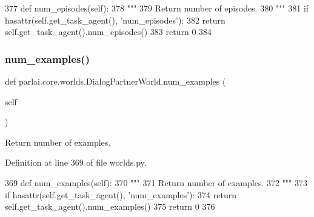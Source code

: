 \begin{DoxyCode}
377     \textcolor{keyword}{def }num\_episodes(self):
378         \textcolor{stringliteral}{"""}
379 \textcolor{stringliteral}{        Return number of episodes.}
380 \textcolor{stringliteral}{        """}
381         \textcolor{keywordflow}{if} hasattr(self.get\_task\_agent(), \textcolor{stringliteral}{'num\_episodes'}):
382             \textcolor{keywordflow}{return} self.get\_task\_agent().num\_episodes()
383         \textcolor{keywordflow}{return} 0
384 
\end{DoxyCode}
\mbox{\label{classparlai_1_1core_1_1worlds_1_1DialogPartnerWorld_aa925a37ec5968d137faf044279943e6a}} 
\subsubsection{\texorpdfstring{num\+\_\+examples()}{num\_examples()}}
{\footnotesize\ttfamily def parlai.\+core.\+worlds.\+Dialog\+Partner\+World.\+num\+\_\+examples (\begin{DoxyParamCaption}\item[{}]{self }\end{DoxyParamCaption})}

\begin{DoxyVerb}Return number of examples.
\end{DoxyVerb}
 

Definition at line 369 of file worlds.\+py.


\begin{DoxyCode}
369     \textcolor{keyword}{def }num\_examples(self):
370         \textcolor{stringliteral}{"""}
371 \textcolor{stringliteral}{        Return number of examples.}
372 \textcolor{stringliteral}{        """}
373         \textcolor{keywordflow}{if} hasattr(self.get\_task\_agent(), \textcolor{stringliteral}{'num\_examples'}):
374             \textcolor{keywordflow}{return} self.get\_task\_agent().num\_examples()
375         \textcolor{keywordflow}{return} 0
376 
\end{DoxyCode}
\mbox{\label{classparlai_1_1core_1_1worlds_1_1DialogPartnerWorld_a3ae10cae524d87d709e55bc7b2fd8265}} 
